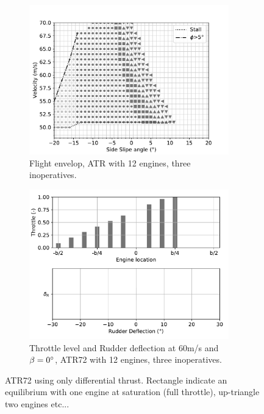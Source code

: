\begin{figure}[hbt]
		\centering
		\begin{subfigure}{0.49\textwidth}
			\includegraphics[width=0.95\textwidth]{DEPoriginalMapBetaVelfin1Eng15RudTrue}
			\caption{Flight envelop, ATR with 12 engines, three inoperatives.}
			\label{fig:DEPoriginalfin1_15engine}
		\end{subfigure}
		\begin{subfigure}{0.49\textwidth}
			\includegraphics[width=0.95\textwidth]{DeflDEPoriginalfin1Eng15RudTrue}
			\caption{Throttle level and Rudder deflection at 60m/s and $\beta=0\degree$, ATR72 with 12 engines, three inoperatives.}
			\label{fig:DeflDEPoriginalfin1_15Eng}
		\end{subfigure}
		\caption{ATR72 using only differential thrust. Rectangle indicate an equilibrium with one engine at saturation (full throttle), up-triangle two engines etc...}\label{DEPfin1_15engMap+Defl}
\end{figure}

